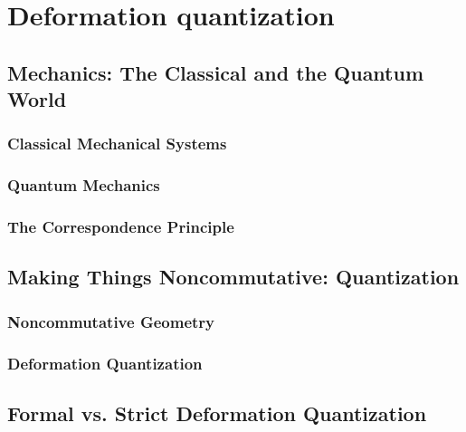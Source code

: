 
%
%

\chapter{Deformation quantization}


\section{Mechanics: The Classical and the Quantum World}
\label{sec:chap2_Mechanics}

\subsection{Classical Mechanical Systems}
\label{subsec:chap2_Classical}

\subsection{Quantum Mechanics}
\label{subsec:chap2_Quantum}

\subsection{The Correspondence Principle}
\label{subsec:chap2_Correspondence}



\section{Making Things Noncommutative: Quantization}
\label{sec:chap2_Quantization}

\subsection{Noncommutative Geometry}
\label{subsec:chap2_NoncommGeometry}

\subsection{Deformation Quantization}
\label{subsec:chap2_Deformation}



\section{Formal vs. Strict Deformation Quantization}
\label{sec:chap2_FormalStrict}

